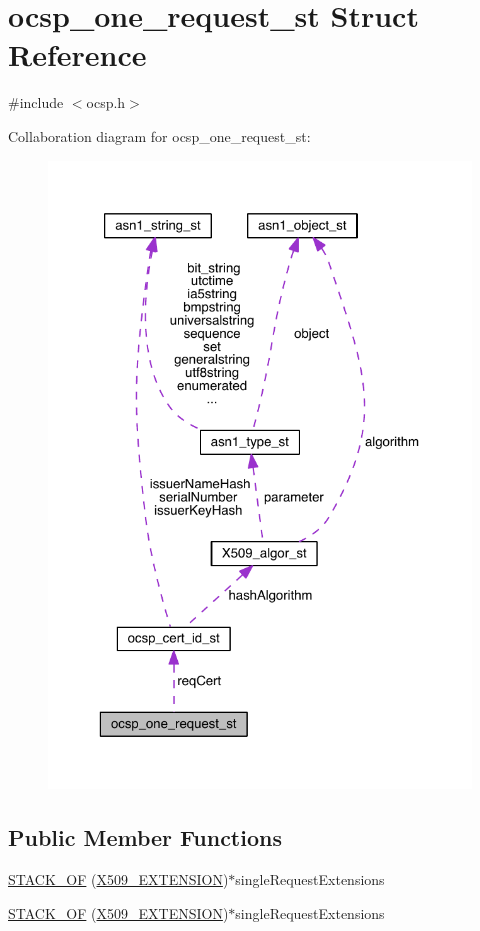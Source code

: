 \hypertarget{structocsp__one__request__st}{}\section{ocsp\+\_\+one\+\_\+request\+\_\+st Struct Reference}
\label{structocsp__one__request__st}


{\ttfamily \#include $<$ocsp.\+h$>$}



Collaboration diagram for ocsp\+\_\+one\+\_\+request\+\_\+st\+:\nopagebreak
\begin{figure}[H]
\begin{center}
\leavevmode
\includegraphics[width=323pt]{structocsp__one__request__st__coll__graph}
\end{center}
\end{figure}
\subsection*{Public Member Functions}
\begin{DoxyCompactItemize}
\item 
\hyperlink{structocsp__one__request__st_ad9cec17ba8dc198d08bdc1abe5037c2b}{S\+T\+A\+C\+K\+\_\+\+OF} (\hyperlink{crypto_2x509_2x509_8h_ab2f7f7dc0ced8684e0cbfc818e408304}{X509\+\_\+\+E\+X\+T\+E\+N\+S\+I\+ON})$\ast$single\+Request\+Extensions
\item 
\hyperlink{structocsp__one__request__st_ad9cec17ba8dc198d08bdc1abe5037c2b}{S\+T\+A\+C\+K\+\_\+\+OF} (\hyperlink{crypto_2x509_2x509_8h_ab2f7f7dc0ced8684e0cbfc818e408304}{X509\+\_\+\+E\+X\+T\+E\+N\+S\+I\+ON})$\ast$single\+Request\+Extensions
\end{DoxyCompactItemize}
